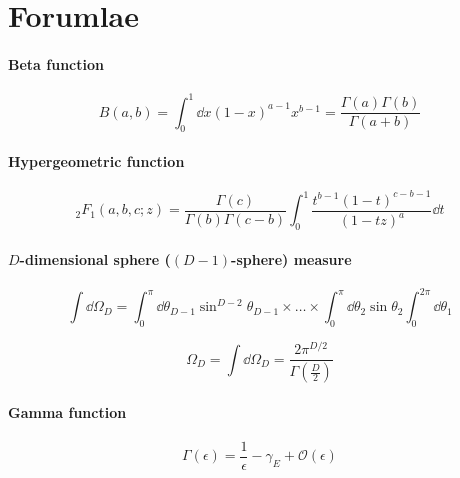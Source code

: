 \section{Forumlae}

\paragraph{Beta function}
\begin{equation*}
B(a,b) = \int_0^1 \dd x (1-x)^{a-1}x^{b-1} = \frac{\Gamma(a)\Gamma(b)}{\Gamma(a+b)}
\end{equation*}

\paragraph{Hypergeometric function}
\begin{equation*}
_2F_1(a,b,c;z) = \frac{\Gamma(c)}{\Gamma(b)\Gamma(c-b)}\int_0^1\frac{t^{b-1} (1-t)^{c-b-1}}{(1-tz)^a} \dd t
\end{equation*}

\paragraph{$D$-dimensional sphere ($(D-1)$-sphere) measure }
\begin{equation*}
\int \dd \Omega_{D} = \int^\pi_0 \dd \theta_{D-1}\sin^{D-2} \theta_{D-1} \times \ldots \times \int^\pi_0 \dd \theta_2 \sin\theta_2 \int^{2\pi}_0 \dd \theta_1
\end{equation*}

\begin{equation*}
\Omega_D = \int \dd \Omega_D = \frac{2\pi^{D/2}}{\Gamma(\frac{D}{2})}
\end{equation*}


\paragraph{Gamma function}
\begin{equation*}
\Gamma(\epsilon) = \frac{1}{\epsilon} - \gamma_E + \mathcal{O}(\epsilon)
\end{equation*}
